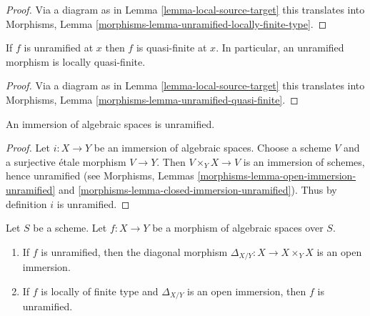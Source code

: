 \begin{proof}
Via a diagram as in
Lemma \ref{lemma-local-source-target}
this translates into
Morphisms, Lemma \ref{morphisms-lemma-unramified-locally-finite-type}.
\end{proof}

\begin{lemma}
\label{lemma-unramified-quasi-finite}
If $f$ is unramified at $x$ then $f$ is quasi-finite at $x$.
In particular, an unramified morphism is locally quasi-finite.
\end{lemma}

\begin{proof}
Via a diagram as in
Lemma \ref{lemma-local-source-target}
this translates into
Morphisms, Lemma \ref{morphisms-lemma-unramified-quasi-finite}.
\end{proof}

\begin{lemma}
\label{lemma-immersion-unramified}
An immersion of algebraic spaces is unramified.
\end{lemma}

\begin{proof}
Let $i : X \to Y$ be an immersion of algebraic spaces. Choose a scheme
$V$ and a surjective \'etale morphism $V \to Y$. Then $V \times_Y X \to V$
is an immersion of schemes, hence unramified (see
Morphisms, Lemmas \ref{morphisms-lemma-open-immersion-unramified} and
\ref{morphisms-lemma-closed-immersion-unramified}).
Thus by definition $i$ is unramified.
\end{proof}

\begin{lemma}
\label{lemma-diagonal-unramified-morphism}
Let $S$ be a scheme.
Let $f : X \to Y$ be a morphism of algebraic spaces over $S$.
\begin{enumerate}
\item If $f$ is unramified, then the diagonal morphism
$\Delta_{X/Y} : X \to X \times_Y X$ is an open immersion.
\item If $f$ is locally of finite type
and $\Delta_{X/Y}$ is an open immersion, then $f$ is unramified.
\end{enumerate}
\end{lemma}

